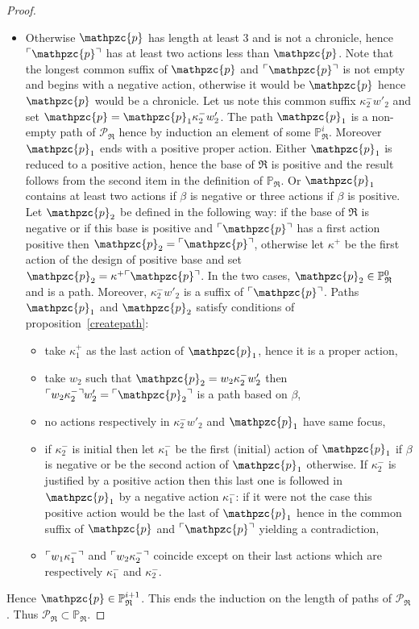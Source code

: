 \documentclass{LMCS}
\newcommand{\design}[1]{{\mathfrak{#1}}}
\newcommand{\pathLL}[1]{\mathpzc{#1}}\newcommand{\strategy}[1]{\pathLL{#1}}\newcommand{\view}[1]{\raisebox{.3ex}{$\ulcorner$}{#1}\raisebox{.3ex}{$\urcorner$}}\newcommand{\fullview}[1]{\raisebox{.3ex}{$\ulcorner\mkern-6mu\ulcorner\mkern-2mu$}{#1}\raisebox{.3ex}{$\mkern-2mu\urcorner\mkern-6mu\urcorner$}}\newcommand{\views}[1]{\view{#1}}\newcommand{\fullviews}[1]{\fullview{#1}}\newcommand{\shuffle}[1]{\llcorner\design{#1}\lrcorner}\newcommand{\PoD}[1]{{\mathcal{P}}_{#1}}\newcommand{\norm}[1]{\llbracket\design{#1}\rrbracket}
\begin{document}
\begin{proof}
\begin{itemize}[label=$-$]
\item Otherwise $\pathLL{p}$ has length at least $3$ and is not a chronicle, hence $\view{\pathLL{p}}$ has at least two actions less than $\pathLL{p}$. 
Note that the longest common suffix of $\pathLL{p}$ and $\view{\pathLL{p}}$ is not empty and begins with a negative action, otherwise it would be $\pathLL{p}$ hence $\pathLL{p}$ would be a chronicle. 
Let us note this common suffix $\kappa_2^-w'_2$ and set $\pathLL{p}=\pathLL{p}_1\kappa_2^-w'_2$. The path $\pathLL{p}_1$ is a non-empty path of $\PoD{\design{R}}$ hence by induction an element of some $\mathbb P^i_{\design{R}}$. Moreover $\pathLL{p}_1$ ends with a positive proper action.
Either $\pathLL{p}_1$ is reduced to a positive action, hence the base of $\design{R}$ is positive and the result follows from the second item in the definition of $\mathbb P_{\design{R}}$.
Or $\pathLL{p}_1$ contains at least two actions if $\beta$ is negative or three actions if $\beta$ is positive.
Let $\pathLL{p}_2$ be defined in the following way: if the base of $\design{R}$ is negative or if this base is positive and $\view{\pathLL{p}}$ has a first action positive then $\pathLL{p}_2 = \view{\pathLL{p}}$, otherwise let $\kappa^+$ be the first action of the design of positive base and set $\pathLL{p}_2 = \kappa^+\view{\pathLL{p}}$. In the two cases, $\pathLL{p}_2 \in \mathbb P^0_{\design{R}}$ and is a path.
Moreover, $\kappa_2^-w'_2$ is a suffix of $\view{\pathLL{p}}$. 
Paths $\pathLL{p}_1$ and $\pathLL{p}_2$ satisfy conditions of
proposition~\ref{createpath}:
\begin{itemize}[label=$\cdot$]
\item take $\kappa^+_1$ as the last action of $\pathLL{p}_1$, hence it is a proper action,
\item take $w_2$ such that $\pathLL{p}_2 = w_2\kappa^-_2w'_2$ then $\view{w_2\kappa^-_2}w'_2 = \view{\pathLL{p}_2}$ is a path based on $\beta$,
\item no actions respectively  in $\kappa_2^-w'_2$ and  $\pathLL{p}_1$ have same focus,
\item if $\kappa_2^-$ is initial then let $\kappa^-_1$ be the first (initial)  action of $\pathLL{p}_1$ if $\beta$ is negative or be the second action of $\pathLL{p}_1$ otherwise. If  $\kappa_2^-$ is justified by a positive action then this last one is followed in $\pathLL{p}_1$ by a negative action $\kappa^-_1$: if it were not the case this positive action would be the last of $\pathLL{p}_1$ hence in the common suffix of $\pathLL{p}$ and $\view{\pathLL{p}}$ yielding a contradiction, 
\item $\view{w_1\kappa^-_1}$ and $\view{w_2\kappa^-_2}$ coincide
  except on their last actions which are respectively $\kappa_1^-$ and
  $\kappa_2^-$.
\end{itemize}
\end{itemize}
Hence $\pathLL{p} \in \mathbb P^{i+1}_{\design{R}}$. 
This ends the induction on the length of paths of $\PoD{\design{R}}$.
Thus $\PoD{\design{R}} \subset \mathbb P_{\design{R}}$.
\end{proof}
\end{document}
